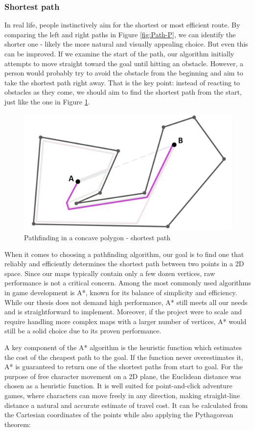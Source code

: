 \subsubsection{Shortest path}
In real life, people instinctively aim for the shortest or most efficient route. By comparing the left and right paths in Figure \ref{fig:Path-P}, we can identify the shorter one - likely the more natural and visually appealing choice. But even this can be improved. If we examine the start of the path, our algorithm initially attempts to move straight toward the goal until hitting an obstacle. However, a person would probably try to avoid the obstacle from the beginning and aim to take the shortest path right away. That is the key point: instead of reacting to obstacles as they come, we should aim to find the shortest path from the start, just like the one in Figure \ref{fig:Path-P2}.
 
\begin{figure}[H]
\centering
\includegraphics[width=.65\linewidth]{img/polygon-prototyp2.png}
\caption{Pathfinding in a concave polygon - shortest path}
\label{fig:Path-P2}
\end{figure}

When it comes to choosing a pathfinding algorithm, our goal is to find one that reliably and efficiently determines the shortest path between two points in a 2D space. Since our maps typically contain only a few dozen vertices, raw performance is not a critical concern. Among the most commonly used algorithms in game development is A*, known for its balance of simplicity and efficiency. While our thesis does not demand high performance, A* still meets all our needs and is straightforward to implement. Moreover, if the project were to scale and require handling more complex maps with a larger number of vertices, A* would still be a solid choice due to its proven performance. 

A key component of the A* algorithm is the heuristic function which estimates the cost of the cheapest path to the goal. If the function never overestimates it, A* is guaranteed to return one of the shortest paths from start to goal. For the purpose of free character movement on a 2D plane, the Euclidean distance was chosen as a heuristic function. It is well suited for point-and-click adventure games, where characters can move freely in any direction, making straight-line distance a natural and accurate estimate of travel cost.  It can be calculated from the Cartesian coordinates of the points while also applying the Pythagorean theorem:

